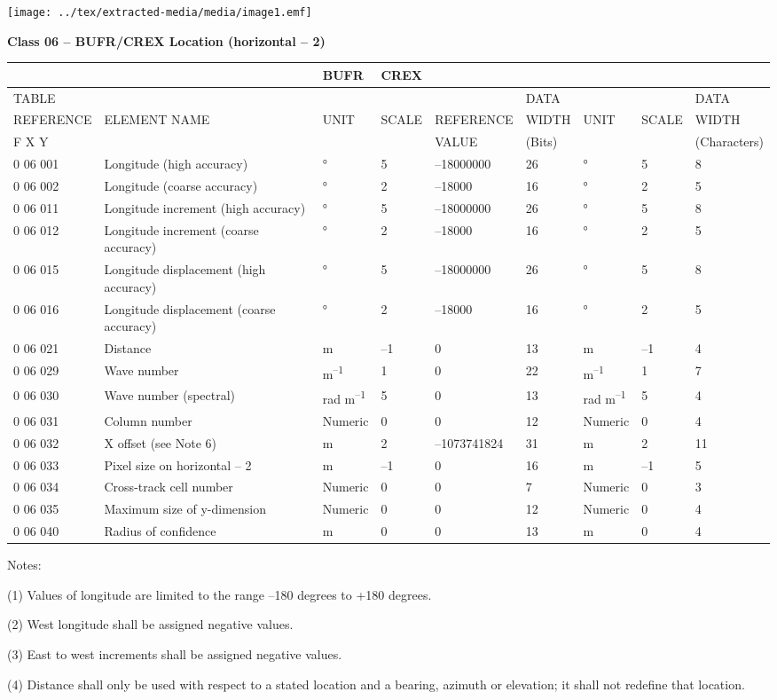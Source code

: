 \texttt{[image: ../tex/extracted-media/media/image1.emf]}

\textbf{Class 06 -- BUFR/CREX Location (horizontal -- 2)}

\begin{longtable}[]{@{}lllllllll@{}}
\toprule
& & BUFR & CREX & & & & &\tabularnewline
\midrule
\endhead
TABLE & & & & & DATA & & & DATA\tabularnewline
REFERENCE & ELEMENT NAME & UNIT & SCALE & REFERENCE & WIDTH & UNIT & SCALE & WIDTH\tabularnewline
F X Y & & & & VALUE & (Bits) & & & (Characters)\tabularnewline
0 06 001 & Longitude (high accuracy) & ° & 5 & --18000000 & 26 & ° & 5 & 8\tabularnewline
0 06 002 & Longitude (coarse accuracy) & ° & 2 & --18000 & 16 & ° & 2 & 5\tabularnewline
0 06 011 & Longitude increment (high accuracy) & ° & 5 & --18000000 & 26 & ° & 5 & 8\tabularnewline
0 06 012 & Longitude increment (coarse accuracy) & ° & 2 & --18000 & 16 & ° & 2 & 5\tabularnewline
0 06 015 & Longitude displacement (high accuracy) & ° & 5 & --18000000 & 26 & ° & 5 & 8\tabularnewline
0 06 016 & Longitude displacement (coarse accuracy) & ° & 2 & --18000 & 16 & ° & 2 & 5\tabularnewline
0 06 021 & Distance & m & --1 & 0 & 13 & m & --1 & 4\tabularnewline
0 06 029 & Wave number & m\textsuperscript{--1} & 1 & 0 & 22 & m\textsuperscript{--1} & 1 & 7\tabularnewline
0 06 030 & Wave number (spectral) & rad m\textsuperscript{--1} & 5 & 0 & 13 & rad m\textsuperscript{--1} & 5 & 4\tabularnewline
0 06 031 & Column number & Numeric & 0 & 0 & 12 & Numeric & 0 & 4\tabularnewline
0 06 032 & X offset (see Note 6) & m & 2 & --1073741824 & 31 & m & 2 & 11\tabularnewline
0 06 033 & Pixel size on horizontal -- 2 & m & --1 & 0 & 16 & m & --1 & 5\tabularnewline
0 06 034 & Cross-track cell number & Numeric & 0 & 0 & 7 & Numeric & 0 & 3\tabularnewline
0 06 035 & Maximum size of y-dimension & Numeric & 0 & 0 & 12 & Numeric & 0 & 4\tabularnewline
0 06 040 & Radius of confidence & m & 0 & 0 & 13 & m & 0 & 4\tabularnewline
\bottomrule
\end{longtable}

Notes:

(1) Values of longitude are limited to the range --180 degrees to +180 degrees.

(2) West longitude shall be assigned negative values.

(3) East to west increments shall be assigned negative values.

(4) Distance shall only be used with respect to a stated location and a bearing, azimuth or elevation; it shall not redefine that location.

